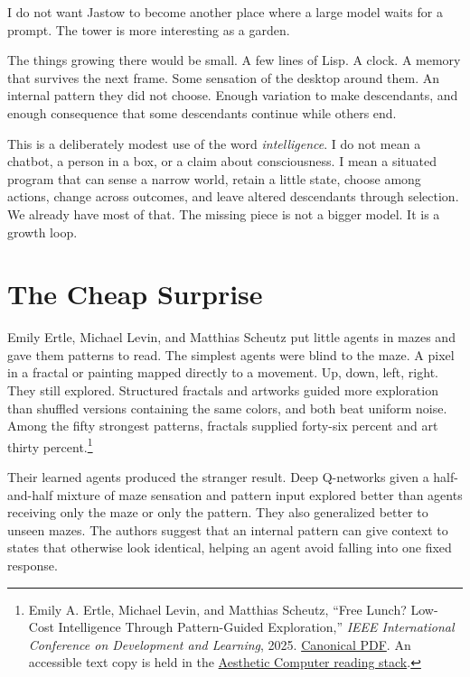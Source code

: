 \documentclass[10pt,letterpaper]{article}
\begin{document}
\thispagestyle{empty}
\vspace*{0.3in}


I do not want Jastow to become another place where a large model waits for a prompt. The tower is more interesting as a garden.

The things growing there would be small. A few lines of Lisp. A clock. A memory that survives the next frame. Some sensation of the desktop around them. An internal pattern they did not choose. Enough variation to make descendants, and enough consequence that some descendants continue while others end.

This is a deliberately modest use of the word \textit{intelligence}. I do not mean a chatbot, a person in a box, or a claim about consciousness. I mean a situated program that can sense a narrow world, retain a little state, choose among actions, change across outcomes, and leave altered descendants through selection. We already have most of that. The missing piece is not a bigger model. It is a growth loop.

\section{The Cheap Surprise}

Emily Ertle, Michael Levin, and Matthias Scheutz put little agents in mazes and gave them patterns to read. The simplest agents were blind to the maze. A pixel in a fractal or painting mapped directly to a movement. Up, down, left, right. They still explored. Structured fractals and artworks guided more exploration than shuffled versions containing the same colors, and both beat uniform noise. Among the fifty strongest patterns, fractals supplied forty-six percent and art thirty percent.\footnote{Emily A. Ertle, Michael Levin, and Matthias Scheutz, ``Free Lunch? Low-Cost Intelligence Through Pattern-Guided Exploration,'' \textit{IEEE International Conference on Development and Learning}, 2025. \href{https://hrilab.tufts.edu/publications/ertleetal25icdl.pdf}{Canonical PDF}. An accessible text copy is held in the \href{https://assets.aesthetic.computer/papers/readings/text/Ertle-Levin-Scheutz-Free-Lunch-Pattern-Guided-Exploration-2025.txt}{Aesthetic Computer reading stack}.}

Their learned agents produced the stranger result. Deep Q-networks given a half-and-half mixture of maze sensation and pattern input explored better than agents receiving only the maze or only the pattern. They also generalized better to unseen mazes. The authors suggest that an internal pattern can give context to states that otherwise look identical, helping an agent avoid falling into one fixed response.
\end{document}
